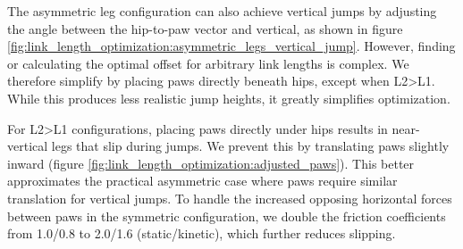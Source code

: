 The asymmetric leg configuration can also achieve vertical jumps by adjusting the angle between the hip-to-paw vector and vertical, as shown in figure \ref{fig:link_length_optimization:asymmetric_legs_vertical_jump}. However, finding or calculating the optimal offset for arbitrary link lengths is complex. We therefore simplify by placing paws directly beneath hips, except when L2>L1. While this produces less realistic jump heights, it greatly simplifies optimization.

For L2>L1 configurations, placing paws directly under hips results in near-vertical legs that slip during jumps. We prevent this by translating paws slightly inward (figure \ref{fig:link_length_optimization:adjusted_paws}). This better approximates the practical asymmetric case where paws require similar translation for vertical jumps. To handle the increased opposing horizontal forces between paws in the symmetric configuration, we double the friction coefficients from 1.0/0.8 to 2.0/1.6 (static/kinetic), which further reduces slipping.


